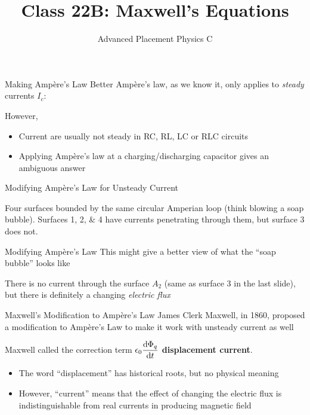 \documentclass[12pt,aspectratio=169]{beamer}
\title{Class 22B: Maxwell's Equations}
\subtitle{Advanced Placement Physics C}
\begin{document}
\begin{frame}
  \maketitle
\end{frame}


\begin{frame}{Making Amp\`{e}re's Law Better}
  Amp\`{e}re's law, as we know it, only applies to \emph{steady} currents $I_c$:

  However,
  \begin{itemize}
  \item Current are usually not steady in RC, RL, LC or RLC circuits
  \item Applying Amp\`{e}re's law at a charging/discharging capacitor gives an
    ambiguous answer
  \end{itemize}
\end{frame}



\begin{frame}{Modifying Amp\`{e}re's Law for Unsteady Current}
  \begin{center}
  \end{center}
  Four surfaces bounded by the same circular Amperian loop
  (think blowing a soap bubble). Surfaces \numlist{1;2;4} have currents
  penetrating through them, but surface \num{3} does not.
\end{frame}



\begin{frame}{Modifying Amp\`{e}re's Law}
  This might give a better view of what the ``soap bubble'' looks like
  \begin{center}
  \end{center}
  There is no current through the surface $A_2$ (same as surface \num{3} in the
  last slide), but there is definitely a changing \emph{electric flux}
\end{frame}



\begin{frame}{Maxwell's Modification to Amp\`{e}re's Law}
  James Clerk Maxwell, in 1860, proposed a modification to Amp\`{e}re's Law
  to make it work with unsteady current as well


  Maxwell called the correction term $\displaystyle\epsilon_0\diff{\Phi_q}t$
  \textbf{displacement current}.
  \begin{itemize}
  \item The word ``displacement'' has historical roots, but no physical meaning
  \item However, ``current'' means that the effect of changing the electric
    flux is indistinguishable from real currents in producing magnetic field
  \end{itemize}
\end{frame}
\end{document}
